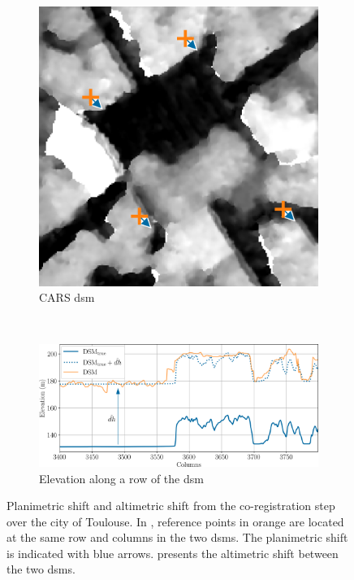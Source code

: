 \begin{figure}
\begin{subfigure}[t]{0.48\linewidth}
        \includegraphics[width=\linewidth]{Images/Chap_6/coregisration_planimetric_shift_cars_toulouse.png}
        \caption{CARS \acrshort{dsm}}
        \label{fig:coregistration_planimetric_cars}
    \end{subfigure}\\
    \begin{subfigure}[t]{\linewidth}
        \centering
        \includegraphics[width=\linewidth]{Images/Chap_6/coregisration_altimetric_shift_toulouse.png}
        \caption{Elevation along a row of the \acrshort{dsm}}
        \label{fig:coregistration_altimetric}
    \end{subfigure}
    \caption{Planimetric shift and altimetric shift from the co-registration step over the city of Toulouse. In , reference points in orange are located at the same row and columns in the two \acrshort{dsm}s. The planimetric shift is indicated with blue arrows.  presents the altimetric shift between the two \acrshort{dsm}s.}
    \label{fig:coregistration_image}
\end{figure}

